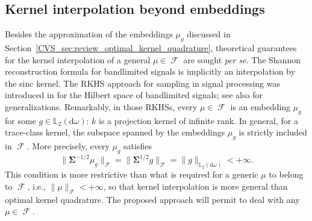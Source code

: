 \documentclass[twoside,11pt]{book}
\numberwithin{theorem}{chapter}
\numberwithin{definition}{chapter}
\numberwithin{proposition}{chapter}
\numberwithin{corollary}{chapter}
\numberwithin{example}{chapter}
\numberwithin{lemma}{chapter}
\numberwithin{assumption}{chapter}
\numberwithin{equation}{chapter}
\numberwithin{figure}{chapter}
\DeclareMathOperator{\F}{\mathcal{F}}
\def\Ltwo{\mathbb{L}_{2}(\mathrm{d} \omega)}
\newcommand{\pc}[1]{\textcolor{blue}{#1}}
\begin{document}
\subsection{Kernel interpolation beyond embeddings}\label{CVS_sec:review_kernel_interpolation_beyond_mu}



Besides the approximation of the embeddings $\mu_{g}$ discussed in Section~\ref{CVS_sec:review_optimal_kernel_quadrature}, theoretical guarantees for the kernel interpolation of a general $\mu\in\F$ are sought \emph{per se}. The Shannon reconstruction formula for bandlimited signals \parencite{Sha48} is implicitly an interpolation by the sinc kernel.
The RKHS approach for sampling in signal processing was introduced in \parencite{Yao67} for the Hilbert space of bandlimited signals;
see also \parencite{NaWa91} for generalizations.
Remarkably, in those RKHSs, every $\mu \in \F$ is an embedding $\mu_{g}$ for some $g \in \Ltwo$: $k$ is a projection kernel of infinite rank. In general, for a trace-class kernel, the subspace spanned by the embeddings $\mu_{g}$ is strictly included in $\F$. More precisely, every $\mu_{g}$ satisfies
\begin{equation}
\|\bm{\Sigma}^{-1/2} \mu_{g}\|_{\F} = \|\bm{\Sigma}^{1/2} g\|_{\F} = \|g\|_{\Ltwo} < +\infty. \nonumber
\end{equation}
This condition is more restrictive than what is required for a generic $\mu$ to belong to $\F$, i.e., $\|\mu\|_{\F}< +\infty$, so that kernel interpolation is more general than optimal kernel quadrature. The proposed approach will permit to deal with any $\mu\in\F$.








%
\end{document}
